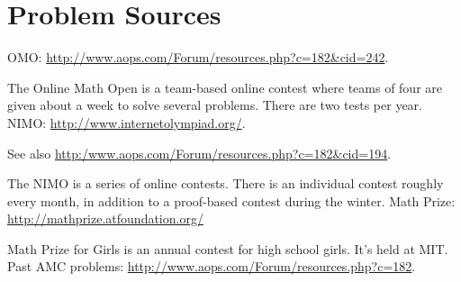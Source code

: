 \documentclass[11pt]{scrartcl}
\begin{document}
\section{Problem Sources}
\begin{itemize}
  \ii OMO: \url{http://www.aops.com/Forum/resources.php?c=182&cid=242}.
  \par The Online Math Open is a team-based online contest where teams of four are given about a week to solve several problems.  There are two tests per year.
  \ii NIMO: \url{http://www.internetolympiad.org/}.
  \par See also \url{http:/www.aops.com/Forum/resources.php?c=182&cid=194}.
  \par The NIMO is a series of online contests.  There is an individual contest roughly every month, in addition to a proof-based contest during the winter.
  \ii Math Prize: \url{http://mathprize.atfoundation.org/}
  \par Math Prize for Girls is an annual contest for high school girls.  It's held at MIT.
  \ii Past AMC problems: \url{http://www.aops.com/Forum/resources.php?c=182}.
\end{itemize}
\end{document}
